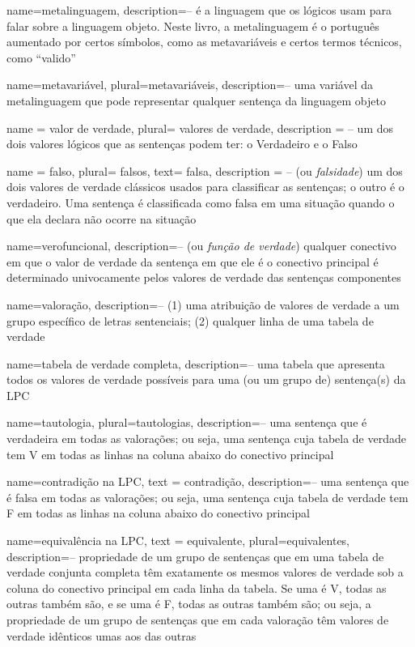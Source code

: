 {
name=metalinguagem,
description={-- é a linguagem que os lógicos usam para falar sobre a linguagem objeto. Neste livro, a metalinguagem é o português aumentado por certos símbolos, como as metavariáveis e certos termos técnicos, como ``valido''}
}

{
name=metavariável,
plural=metavariáveis,
description={-- uma variável da metalinguagem que pode representar qualquer sentença da linguagem objeto}
}

{
name = valor de verdade,
plural= valores de verdade,
description = {-- um dos dois valores lógicos que as sentenças podem ter: o Verdadeiro e o Falso}
}

{
name = falso,
plural= falsos,
text= falsa,
description = {-- (ou \textit{falsidade}) um dos dois valores de verdade clássicos usados para classificar as sentenças; o outro é o verdadeiro. Uma sentença é classificada como falsa em uma situação quando o que ela declara não ocorre na situação}
}

{
name=verofuncional,
description={-- (ou \textit{função de verdade}) qualquer conectivo em que o valor de verdade da sentença em que ele é o conectivo principal é determinado univocamente pelos valores de verdade das sentenças componentes}
}

{
name=valoração,
description={-- (1) uma atribuição de valores de verdade a um grupo específico de letras sentenciais; (2) qualquer linha de uma tabela de verdade}
}

{
name=tabela de verdade completa,
description={-- uma tabela que apresenta todos os valores de verdade possíveis para uma (ou um grupo de) sentença(s) da LPC}
}

{
name=tautologia,
plural=tautologias,
description={-- uma sentença que é verdadeira em todas as valorações; ou seja, uma sentença cuja tabela de verdade tem V em todas as linhas na coluna abaixo do conectivo principal}
}

{
  name=contradição na LPC,
  text = contradição,
description={-- uma sentença que é falsa em todas as valorações; ou seja, uma sentença cuja tabela de verdade tem F em todas as linhas na coluna abaixo do conectivo principal}
}

{
  name=equivalência na LPC,
  text = equivalente,
  plural=equivalentes,
description={-- propriedade de um grupo de sentenças que em uma tabela de verdade conjunta completa têm exatamente os mesmos valores de verdade sob a coluna do conectivo principal em cada linha da tabela. Se uma é V, todas as outras também são, e se uma é F, todas as outras também são; ou seja, a propriedade de um grupo de sentenças que em cada valoração têm valores de verdade idênticos umas aos das outras}
}

